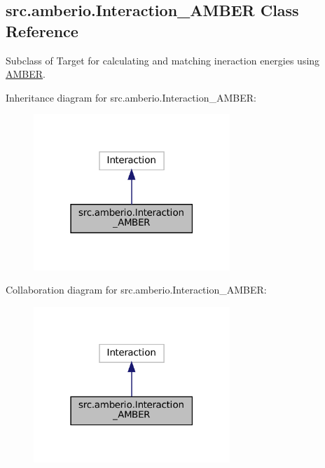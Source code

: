 \hypertarget{classsrc_1_1amberio_1_1Interaction__AMBER}{}\subsection{src.\+amberio.\+Interaction\+\_\+\+A\+M\+B\+ER Class Reference}
\label{classsrc_1_1amberio_1_1Interaction__AMBER}


Subclass of Target for calculating and matching ineraction energies using \hyperlink{classsrc_1_1amberio_1_1AMBER}{A\+M\+B\+ER}.  




Inheritance diagram for src.\+amberio.\+Interaction\+\_\+\+A\+M\+B\+ER\+:
\nopagebreak
\begin{figure}[H]
\begin{center}
\leavevmode
\includegraphics[width=210pt]{classsrc_1_1amberio_1_1Interaction__AMBER__inherit__graph}
\end{center}
\end{figure}


Collaboration diagram for src.\+amberio.\+Interaction\+\_\+\+A\+M\+B\+ER\+:
\nopagebreak
\begin{figure}[H]
\begin{center}
\leavevmode
\includegraphics[width=210pt]{classsrc_1_1amberio_1_1Interaction__AMBER__coll__graph}
\end{center}
\end{figure}
